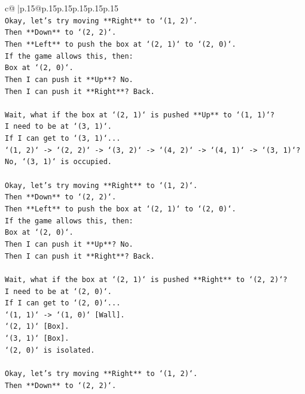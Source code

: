 \documentclass{article}
\begin{document}
{\begin{supertabular}{c@{$\;$}|p{.15\linewidth}@{}p{.15\linewidth}p{.15\linewidth}p{.15\linewidth}p{.15\linewidth}p{.15\linewidth}}
{{{\\ 
\texttt{Okay, let's try moving **Right** to `(1, 2)`.} \\
\texttt{Then **Down** to `(2, 2)`.} \\
\texttt{Then **Left** to push the box at `(2, 1)` to `(2, 0)`.} \\
\texttt{If the game allows this, then:} \\
\texttt{Box at `(2, 0)`.} \\
\texttt{Then I can push it **Up**? No.} \\
\texttt{Then I can push it **Right**? Back.} \\
\\ 
\texttt{Wait, what if the box at `(2, 1)` is pushed **Up** to `(1, 1)`?} \\
\texttt{I need to be at `(3, 1)`.} \\
\texttt{If I can get to `(3, 1)`...} \\
\texttt{`(1, 2)` {-}> `(2, 2)` {-}> `(3, 2)` {-}> `(4, 2)` {-}> `(4, 1)` {-}> `(3, 1)`? No, `(3, 1)` is occupied.} \\
\\ 
\texttt{Okay, let's try moving **Right** to `(1, 2)`.} \\
\texttt{Then **Down** to `(2, 2)`.} \\
\texttt{Then **Left** to push the box at `(2, 1)` to `(2, 0)`.} \\
\texttt{If the game allows this, then:} \\
\texttt{Box at `(2, 0)`.} \\
\texttt{Then I can push it **Up**? No.} \\
\texttt{Then I can push it **Right**? Back.} \\
\\ 
\texttt{Wait, what if the box at `(2, 1)` is pushed **Right** to `(2, 2)`?} \\
\texttt{I need to be at `(2, 0)`.} \\
\texttt{If I can get to `(2, 0)`...} \\
\texttt{`(1, 1)` {-}> `(1, 0)` {[}Wall{]}.} \\
\texttt{`(2, 1)` {[}Box{]}.} \\
\texttt{`(3, 1)` {[}Box{]}.} \\
\texttt{`(2, 0)` is isolated.} \\
\\ 
\texttt{Okay, let's try moving **Right** to `(1, 2)`.} \\
\texttt{Then **Down** to `(2, 2)`.} \\
}}}
\end{supertabular}}
\end{document}
